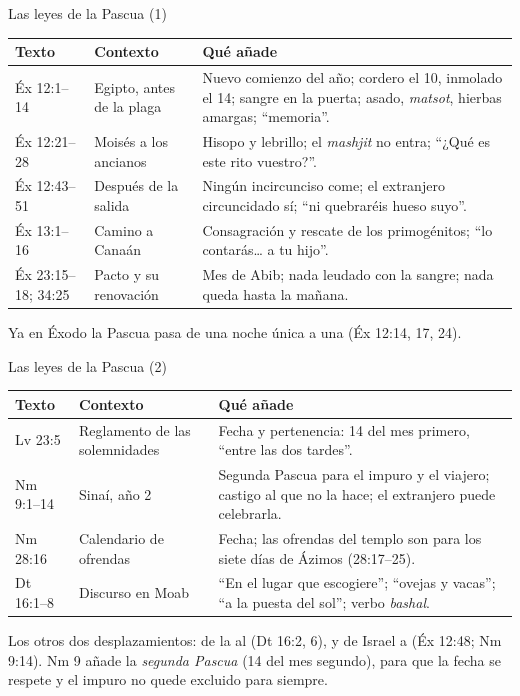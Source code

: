 \begin{frame}{Las leyes de la Pascua (1)}
\scriptsize\renewcommand{\arraystretch}{1.15}
\begin{tabular}{@{}L{1.9cm}L{2.6cm}L{7.6cm}@{}}
\toprule
\textbf{Texto} & \textbf{Contexto} & \textbf{Qué añade} \\ \midrule
Éx 12:1--14 & Egipto, antes de la plaga & Nuevo comienzo del año; cordero el 10, inmolado el 14; sangre en la puerta; asado, \emph{matsot}, hierbas amargas; ``memoria''. \\
Éx 12:21--28 & Moisés a los ancianos & Hisopo y lebrillo; el \emph{mashjit} no entra; ``¿Qué es este rito vuestro?''. \\
Éx 12:43--51 & Después de la salida & Ningún incircunciso come; el extranjero circuncidado sí; ``ni quebraréis hueso suyo''. \\
Éx 13:1--16 & Camino a Canaán & Consagración y rescate de los primogénitos; ``lo contarás\ldots{} a tu hijo''. \\
Éx 23:15--18; 34:25 & Pacto y su renovación & Mes de Abib; nada leudado con la sangre; nada queda hasta la mañana. \\
\bottomrule
\end{tabular}\par\medskip
\small\RaggedRight Ya en Éxodo la Pascua pasa de una noche única a una  (Éx 12:14, 17, 24).
\end{frame}

\begin{frame}{Las leyes de la Pascua (2)}
\scriptsize\renewcommand{\arraystretch}{1.15}
\begin{tabular}{@{}L{1.9cm}L{2.6cm}L{7.6cm}@{}}
\toprule
\textbf{Texto} & \textbf{Contexto} & \textbf{Qué añade} \\ \midrule
Lv 23:5 & Reglamento de las solemnidades & Fecha y pertenencia: 14 del mes primero, ``entre las dos tardes''. \\
Nm 9:1--14 & Sinaí, año 2 & Segunda Pascua para el impuro y el viajero; castigo al que no la hace; el extranjero puede celebrarla. \\
Nm 28:16 & Calendario de ofrendas & Fecha; las ofrendas del templo son para los siete días de Ázimos (28:17--25). \\
Dt 16:1--8 & Discurso en Moab & ``En el lugar que \SENOR{} escogiere''; ``ovejas y vacas''; ``a la puesta del sol''; verbo \emph{bashal}. \\
\bottomrule
\end{tabular}\par\medskip
\small\RaggedRight Los otros dos desplazamientos: de la  al  (Dt 16:2, 6), y de Israel a  (Éx 12:48; Nm 9:14). Nm 9 añade la \emph{segunda Pascua} (14 del mes segundo), para que la fecha se respete y el impuro no quede excluido para siempre.
\end{frame}


